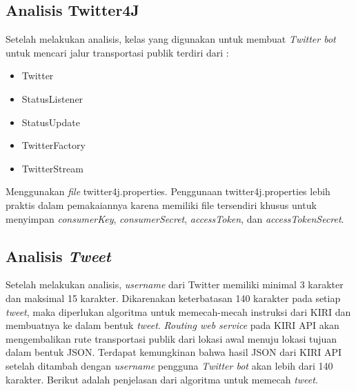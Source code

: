 \subsection{Analisis Twitter4J}
Setelah melakukan analisis, kelas yang digunakan untuk membuat \textit{Twitter bot} untuk mencari jalur transportasi publik terdiri dari :
\begin{itemize}
	\item Twitter
	\item StatusListener
	\item StatusUpdate
	\item TwitterFactory
	\item TwitterStream
\end{itemize}

Menggunakan \textit{file} twitter4j.properties. Penggunaan twitter4j.properties lebih praktis dalam pemakaiannya karena memiliki file tersendiri khusus untuk menyimpan \textit{consumerKey}, \textit{consumerSecret}, \textit{accessToken}, dan \textit{accessTokenSecret}.

\subsection{Analisis \textit{Tweet}}
Setelah melakukan analisis, \textit{username} dari Twitter memiliki minimal 3 karakter dan maksimal 15 karakter. Dikarenakan keterbatasan 140 karakter pada setiap \textit{tweet}, maka diperlukan algoritma untuk memecah-mecah instruksi dari KIRI dan membuatnya ke dalam bentuk \textit{tweet}. \textit{Routing web service} pada KIRI API akan mengembalikan rute transportasi publik dari lokasi awal menuju lokasi tujuan dalam bentuk JSON. Terdapat kemungkinan bahwa hasil JSON dari KIRI API setelah ditambah dengan \textit{username} pengguna \textit{Twitter bot} akan lebih dari 140 karakter. Berikut adalah penjelasan dari algoritma untuk memecah \textit{tweet}.

